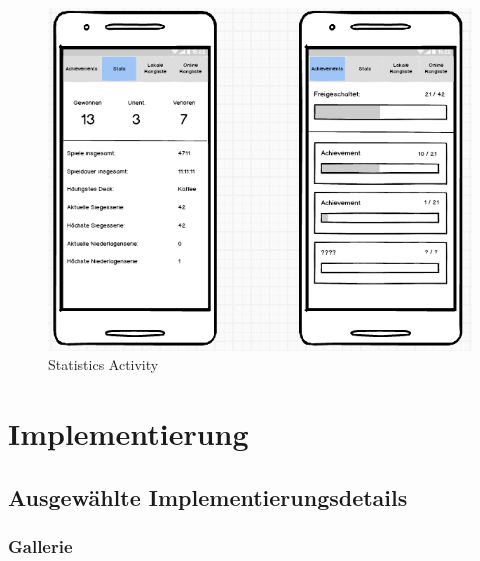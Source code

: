 \documentclass{scrartcl}
\begin{document}
\begin{figure}
\centering
	\includegraphics[scale=0.75]{img/mockup_stats_2.png}
	\caption{Statistics Activity}
	\label{stats2}
\end{figure}


\section{Implementierung}
\subsection{Ausgewählte Implementierungsdetails}
\subsubsection{Gallerie}
\end{document}
